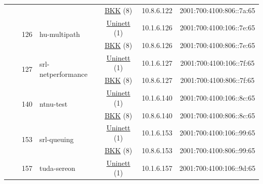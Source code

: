 \begin{small}
\begin{center}
\begin{longtable}{|c|c|c|c|c|c|c|c|}
  &  &  &  & \multicolumn{2}{|c|}{\tiny{\href{http://bkk.no}{BKK} (8)}} & \tiny{10.8.6.122} & \tiny{2001:700:4100:806::7a:65} \\* \cline{3-3}\cline{4-4}\cline{5-5}\cline{6-6}\cline{7-7}\cline{8-8}
  &  & \multirow{2}{*}{\tiny{126}} & \multicolumn{1}{|l|}{\multirow{2}{*}{\tiny{hu-multipath}}} & \multicolumn{2}{|c|}{\tiny{\href{https://www.uninett.no}{Uninett} (1)}} & \tiny{10.1.6.126} & \tiny{2001:700:4100:106::7e:65} \\* \cline{5-5}\cline{6-6}\cline{7-7}\cline{8-8}
  &  &  &  & \multicolumn{2}{|c|}{\tiny{\href{http://bkk.no}{BKK} (8)}} & \tiny{10.8.6.126} & \tiny{2001:700:4100:806::7e:65} \\* \cline{3-3}\cline{4-4}\cline{5-5}\cline{6-6}\cline{7-7}\cline{8-8}
  &  & \multirow{2}{*}{\tiny{127}} & \multicolumn{1}{|l|}{\multirow{2}{*}{\tiny{srl-netperformance}}} & \multicolumn{2}{|c|}{\tiny{\href{https://www.uninett.no}{Uninett} (1)}} & \tiny{10.1.6.127} & \tiny{2001:700:4100:106::7f:65} \\* \cline{5-5}\cline{6-6}\cline{7-7}\cline{8-8}
  &  &  &  & \multicolumn{2}{|c|}{\tiny{\href{http://bkk.no}{BKK} (8)}} & \tiny{10.8.6.127} & \tiny{2001:700:4100:806::7f:65} \\* \cline{3-3}\cline{4-4}\cline{5-5}\cline{6-6}\cline{7-7}\cline{8-8}
  &  & \multirow{2}{*}{\tiny{140}} & \multicolumn{1}{|l|}{\multirow{2}{*}{\tiny{ntnu-test}}} & \multicolumn{2}{|c|}{\tiny{\href{https://www.uninett.no}{Uninett} (1)}} & \tiny{10.1.6.140} & \tiny{2001:700:4100:106::8c:65} \\* \cline{5-5}\cline{6-6}\cline{7-7}\cline{8-8}
  &  &  &  & \multicolumn{2}{|c|}{\tiny{\href{http://bkk.no}{BKK} (8)}} & \tiny{10.8.6.140} & \tiny{2001:700:4100:806::8c:65} \\* \cline{3-3}\cline{4-4}\cline{5-5}\cline{6-6}\cline{7-7}\cline{8-8}
  &  & \multirow{2}{*}{\tiny{153}} & \multicolumn{1}{|l|}{\multirow{2}{*}{\tiny{srl-queuing}}} & \multicolumn{2}{|c|}{\tiny{\href{https://www.uninett.no}{Uninett} (1)}} & \tiny{10.1.6.153} & \tiny{2001:700:4100:106::99:65} \\* \cline{5-5}\cline{6-6}\cline{7-7}\cline{8-8}
  &  &  &  & \multicolumn{2}{|c|}{\tiny{\href{http://bkk.no}{BKK} (8)}} & \tiny{10.8.6.153} & \tiny{2001:700:4100:806::99:65} \\* \cline{3-3}\cline{4-4}\cline{5-5}\cline{6-6}\cline{7-7}\cline{8-8}
  &  & \multirow{2}{*}{\tiny{157}} & \multicolumn{1}{|l|}{\multirow{2}{*}{\tiny{tuda-sereon}}} & \multicolumn{2}{|c|}{\tiny{\href{https://www.uninett.no}{Uninett} (1)}} & \tiny{10.1.6.157} & \tiny{2001:700:4100:106::9d:65} \\* \cline{5-5}\cline{6-6}\cline{7-7}\cline{8-8}

\end{longtable}
\end{center}
\end{small}
